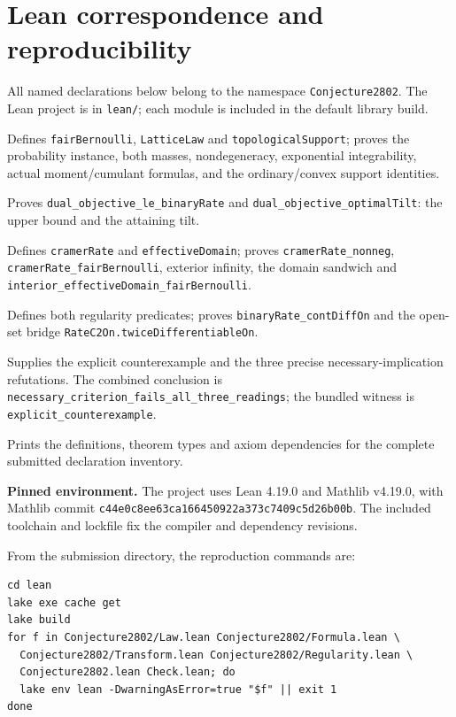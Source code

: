 \documentclass[11pt,a4paper]{article}
\newcommand{\code}[1]{\nolinkurl{#1}}
\begin{document}
\section{Lean correspondence and reproducibility}
\small
All named declarations below belong to the namespace \code{Conjecture2802}. The Lean project is in \code{lean/}; each module is included in the default library build.
\begin{description}\raggedright\setlength{\itemsep}{2pt}\setlength{\parsep}{0pt}
\item[\code{Law.lean}] Defines \code{fairBernoulli}, \code{LatticeLaw} and \code{topologicalSupport}; proves the probability instance, both masses, nondegeneracy, exponential integrability, actual moment/cumulant formulas, and the ordinary/convex support identities.
\item[\code{Formula.lean}] Proves \code{dual_objective_le_binaryRate} and \code{dual_objective_optimalTilt}: the upper bound and the attaining tilt.
\item[\code{Transform.lean}] Defines \code{cramerRate} and \code{effectiveDomain}; proves \code{cramerRate_nonneg}, \code{cramerRate_fairBernoulli}, exterior infinity, the domain sandwich and \code{interior_effectiveDomain_fairBernoulli}.
\item[\code{Regularity.lean}] Defines both regularity predicates; proves \code{binaryRate_contDiffOn} and the open-set bridge \code{RateC2On.twiceDifferentiableOn}.
\item[\code{Conjecture2802.lean}] Supplies the explicit counterexample and the three precise necessary-implication refutations. The combined conclusion is \code{necessary_criterion_fails_all_three_readings}; the bundled witness is \code{explicit_counterexample}.
\item[\code{Check.lean}] Prints the definitions, theorem types and axiom dependencies for the complete submitted declaration inventory.
\end{description}

\textbf{Pinned environment.}
The project uses Lean 4.19.0 and Mathlib v4.19.0, with Mathlib commit
\code{c44e0c8ee63ca166450922a373c7409c5d26b00b}. The included toolchain and lockfile fix the compiler and dependency revisions.

From the submission directory, the reproduction commands are:
\begin{Verbatim}[fontsize=\small]
cd lean
lake exe cache get
lake build
for f in Conjecture2802/Law.lean Conjecture2802/Formula.lean \
  Conjecture2802/Transform.lean Conjecture2802/Regularity.lean \
  Conjecture2802.lean Check.lean; do
  lake env lean -DwarningAsError=true "$f" || exit 1
done
\end{Verbatim}
\end{document}
